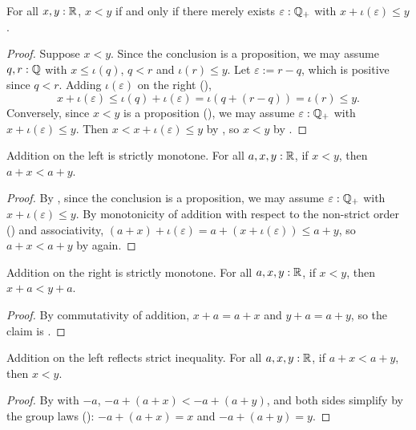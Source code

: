 \begin{theorem}
  \label{ltIffExistsAddRatLeReal}
  For all $x, y : \mathbb{R}$, $x < y$ if and only if there merely exists $\varepsilon : \mathbb{Q}_{+}$ with $x + \iota(\varepsilon) \le y$.
\end{theorem}
\begin{proof}
  Suppose $x < y$. Since the conclusion is a proposition, we may assume $q, r : \mathbb{Q}$ with $x \le \iota(q)$, $q < r$ and $\iota(r) \le y$. Let $\varepsilon := r - q$, which is positive since $q < r$. Adding $\iota(\varepsilon)$ on the right (),
  \[
    x + \iota(\varepsilon) \le \iota(q) + \iota(\varepsilon) = \iota(q + (r - q)) = \iota(r) \le y.
  \]
  Conversely, since $x < y$ is a proposition (), we may assume $\varepsilon : \mathbb{Q}_{+}$ with $x + \iota(\varepsilon) \le y$. Then $x < x + \iota(\varepsilon) \le y$ by , so $x < y$ by .
\end{proof}

\begin{lemma}
  \label{plusMonoLLtReal}
  Addition on the left is strictly monotone. For all $a, x, y : \mathbb{R}$, if $x < y$, then $a + x < a + y$.
\end{lemma}
\begin{proof}
  By , since the conclusion is a proposition, we may assume $\varepsilon : \mathbb{Q}_{+}$ with $x + \iota(\varepsilon) \le y$. By monotonicity of addition with respect to the non-strict order () and associativity, $(a + x) + \iota(\varepsilon) = a + (x + \iota(\varepsilon)) \le a + y$, so $a + x < a + y$ by  again.
\end{proof}

\begin{corollary}
  \label{plusMonoRLtReal}
  Addition on the right is strictly monotone. For all $a, x, y : \mathbb{R}$, if $x < y$, then $x + a < y + a$.
\end{corollary}
\begin{proof}
  By commutativity of addition, $x + a = a + x$ and $y + a = a + y$, so the claim is .
\end{proof}

\begin{corollary}
  \label{plusReflectLLtReal}
  Addition on the left reflects strict inequality. For all $a, x, y : \mathbb{R}$, if $a + x < a + y$, then $x < y$.
\end{corollary}
\begin{proof}
  By  with $-a$, $-a + (a + x) < -a + (a + y)$, and both sides simplify by the group laws (): $-a + (a + x) = x$ and $-a + (a + y) = y$.
\end{proof}


